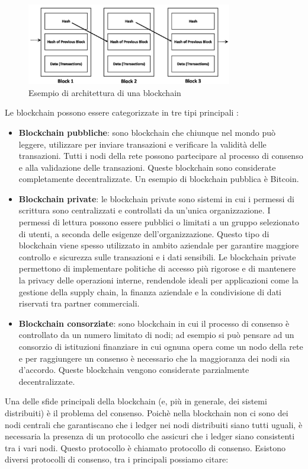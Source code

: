 \documentclass[../../Thesis.tex]{subfiles}
\begin{document}
\begin{figure}[h!]
    \centering
    \includegraphics[width=0.8\textwidth]{../../img/Blockchain.png}
    \caption{Esempio di architettura di una blockchain}
    \label{fig:Blockchain}
\end{figure}
Le blockchain possono essere categorizzate in tre tipi principali \cite{Tassonomia}:
\begin{itemize}
    \item \textbf{Blockchain pubbliche}: sono blockchain che chiunque nel mondo pu\`o leggere, utilizzare per inviare transazioni e verificare la validit\`a delle transazioni. Tutti i nodi della rete possono partecipare al processo di consenso e alla validazione delle transazioni. Queste blockchain sono considerate completamente decentralizzate. Un esempio di blockchain pubblica \`e Bitcoin.
    \item \textbf{Blockchain private}: le blockchain private sono sistemi in cui i permessi di scrittura sono centralizzati e controllati da un'unica organizzazione. I permessi di lettura possono essere pubblici o limitati a un gruppo selezionato di utenti, a seconda delle esigenze dell'organizzazione. Questo tipo di blockchain viene spesso utilizzato in ambito aziendale per garantire maggiore controllo e sicurezza sulle transazioni e i dati sensibili. Le blockchain private permettono di implementare politiche di accesso pi\`u rigorose e di mantenere la privacy delle operazioni interne, rendendole ideali per applicazioni come la gestione della supply chain, la finanza aziendale e la condivisione di dati riservati tra partner commerciali.
    \item \textbf{Blockchain consorziate}: sono blockchain in cui il processo di consenso \`e controllato da un numero limitato di nodi; ad esempio si pu\`o pensare ad un consorzio di istituzioni finanziare in cui ognuna opera come un nodo della rete e per raggiungere un consenso \`e necessario che la maggioranza dei nodi sia d'accordo. Queste blockchain vengono considerate parzialmente decentralizzate.
\end{itemize}
Una delle sfide principali della blockchain (e, pi\`u in generale, dei sistemi distribuiti) \`e il problema del consenso. Poich\`e nella blockchain non ci sono dei nodi centrali che garantiscano che i ledger nei nodi distribuiti siano tutti uguali, \`e necessaria la presenza di un protocollo che assicuri che i ledger siano consistenti tra i vari nodi. Questo protocollo \`e chiamato protocollo di consenso. Esistono diversi protocolli di consenso, tra i principali possiamo citare:
\end{document}
